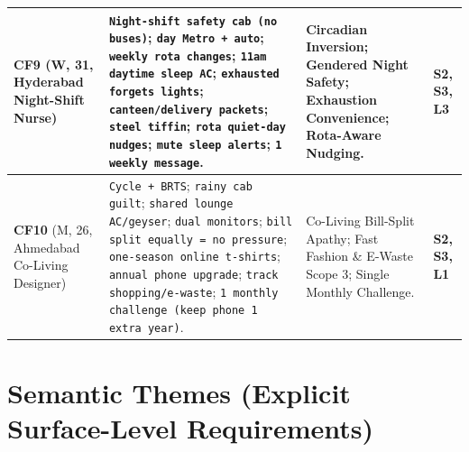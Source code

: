 \documentclass[12pt, a4paper]{article}
\begin{document}
{\begin{longtable}{|>{\raggedright\arraybackslash}p{3.0cm}|>{\raggedright\arraybackslash}p{7.1cm}|>{\raggedright\arraybackslash}p{3.7cm}|>{\raggedright\arraybackslash}p{1.9cm}|}
\textbf{CF9} \cite{cf9} (W, 31, Hyderabad Night-Shift Nurse) & 
\texttt{Night-shift safety cab (no buses)}; \texttt{day Metro + auto}; \texttt{weekly rota changes}; \texttt{11am daytime sleep AC}; \texttt{exhausted forgets lights}; \texttt{canteen/delivery packets}; \texttt{steel tiffin}; \texttt{rota quiet-day nudges}; \texttt{mute sleep alerts}; \texttt{1 weekly message}. & 
Circadian Inversion; Gendered Night Safety; Exhaustion Convenience; Rota-Aware Nudging. & 
\textbf{S2, S3, L3} \\
\hline

\textbf{CF10} \cite{cf10} (M, 26, Ahmedabad Co-Living Designer) & 
\texttt{Cycle + BRTS}; \texttt{rainy cab guilt}; \texttt{shared lounge AC/geyser}; \texttt{dual monitors}; \texttt{bill split equally = no pressure}; \texttt{one-season online t-shirts}; \texttt{annual phone upgrade}; \texttt{track shopping/e-waste}; \texttt{1 monthly challenge (keep phone 1 extra year)}. & 
Co-Living Bill-Split Apathy; Fast Fashion \& E-Waste Scope 3; Single Monthly Challenge. & 
\textbf{S2, S3, L1} \\
\hline
\end{longtable}
}

\section{Semantic Themes (Explicit Surface-Level Requirements)}
\end{document}
